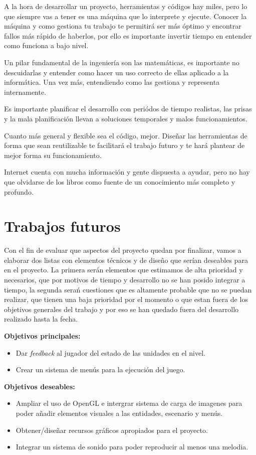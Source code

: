 A la hora de desarrollar un proyecto, herramientas y códigos hay miles, pero lo que siempre vas a tener es
una máquina que lo interprete y ejecute. Conocer la máquina y como gestiona tu trabajo te permitirá ser más óptimo y encontrar fallos más rápido de haberlos, por ello es importante invertir tiempo en entender como
funciona a bajo nivel. 

Un pilar fundamental de la ingeniería son las matemáticas, es importante no descuidarlas y entender como
hacer un uso correcto de ellas aplicado a la informática. Una vez más, entendiendo como las gestiona y
representa internamente.

Es importante planificar el desarrollo con periódos de tiempo realistas, las prisas y la mala planificación
llevan a soluciones temporales y malos funcionamientos.

Cuanto más general y flexible sea el código, mejor. Diseñar las herramientas de forma que sean reutilizable
te facilitará el trabajo futuro y te hará plantear de mejor forma su funcionamiento.

Internet cuenta con mucha información y gente dispuesta a ayudar, pero no hay que olvidarse de los libros
como fuente de un conocimiento más completo y profundo.


\section{Trabajos futuros}
Con el fin de evaluar que aspectos del proyecto quedan por finalizar, vamos a elaborar dos
listas con elementos técnicos y de diseño que serían deseables para en el proyecto.
La primera serán elementos que estimamos de alta prioridad y necesarios, que por motivos de tiempo
y desarrollo no se han posido integrar a tiempo, la segunda serań cuestiones que es altamente probable 
que no se puedan realizar, que tienen una baja prioridad por el momento o que estan fuera de los
objetivos generales del trabajo y por eso se han quedado fuera del desarrollo realizado hasta la fecha.

\textbf{Objetivos principales:}
\begin{itemize}
	\item Dar \textit{feedback} al jugador del estado de las unidades en el nivel.

	\item Crear un sistema de menús para la ejecución del juego.
\end{itemize}

\textbf{Objetivos deseables:}
\begin{itemize}
	\item Ampliar el uso de OpenGL e intergrar sistema de carga de imagenes para poder añadir
	elementos visuales a las entidades, escenario y menús.

	\item Obtener/diseñar recursos gráficos apropiados para el proyecto.

	\item Integrar un sistema de sonido para poder reproducir al menos una melodia.
\end{itemize}